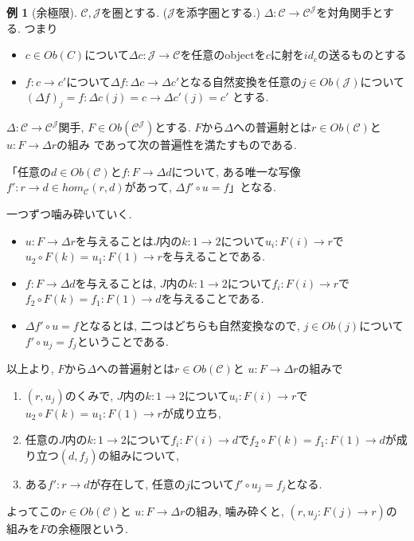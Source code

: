 \documentclass[dvipdfmx,a4paper,11pt]{article}
\theoremstyle{definition}
\newtheorem{exa}[thm]{例}
\begin{document}
\begin{exa}[余極限]
$\mathcal{C}, \mathcal{J}$を圏とする. ($\mathcal{J}$を添字圏とする.)
$\Delta : \mathcal{C} \to \mathcal{C}^{\mathcal{J}}$を対角関手とする.
つまり
\begin{itemize}
\item$c \in Ob(C)$について$\Delta c : \mathcal{J} \to \mathcal{C}$を任意のobjectを$c$に射を$id_c$の送るものとする
\item  $f: c \to c'$について$\Delta f : \Delta c \to \Delta c'$となる自然変換を任意の$j \in Ob(\mathcal{J})$について$(\Delta f)_{j}=f : \Delta c(j) = c \to \Delta c' (j)=c' $ とする.
\end{itemize}

$\Delta : \mathcal{C} \to \mathcal{C}^{\mathcal{J}}$関手, 
$F \in Ob(\mathcal{C}^{\mathcal{J}})$とする.
$F$から$\Delta $への普遍射とは$r \in Ob(\mathcal{C})$と $u: F \to \Delta r$の組み
であって次の普遍性を満たすものである.

「任意の$d \in Ob(\mathcal{C})$と$f : F\to \Delta d$について, ある唯一な写像$f' : r \to d \in hom_{\mathcal{C}}(r,d)$があって, $\Delta f' \circ u =f$」となる.

一つずつ噛み砕いていく.
\begin{itemize}
\item $u: F \to \Delta r$を与えることは$J$内の$k : 1\to 2$について$u_i : F(i) \to r$で$u_2 \circ F(k) = u_1 : F(1) \to r$を与えることである.
\item $f : F\to \Delta d$を与えることは, $J$内の$k : 1\to 2$について$f_i : F(i) \to r$で$f_2 \circ F(k) = f_1 : F(1) \to d$を与えることである.
\item  $\Delta f' \circ u =f$となるとは, 二つはどちらも自然変換なので, $j \in Ob(j)$について$f' \circ u_j = f_j$ということである.
\end{itemize}
以上より, $F$から$\Delta $への普遍射とは$r \in Ob(\mathcal{C})$と $u: F \to \Delta r$の組みで
\begin{enumerate}
\item $(r, u_j)$のくみで, $J$内の$k : 1\to 2$について$u_i : F(i) \to r$で$u_2 \circ F(k) = u_1 : F(1) \to r$が成り立ち, 
\item 任意の$J$内の$k : 1\to 2$について$f_i : F(i) \to d$で$f_2 \circ F(k) = f_1 : F(1) \to d$が成り立つ$(d, f_j)$の組みについて,
\item ある$f' : r \to d$が存在して, 任意の$j$について$f' \circ u_j = f_j$となる.
\end{enumerate}
よってこの$r \in Ob(\mathcal{C})$と $u: F \to \Delta r$の組み, 噛み砕くと,
$(r, u_j : F(j) \to r)$の組みを$F$の余極限という. 
\end{exa}
\end{document}

